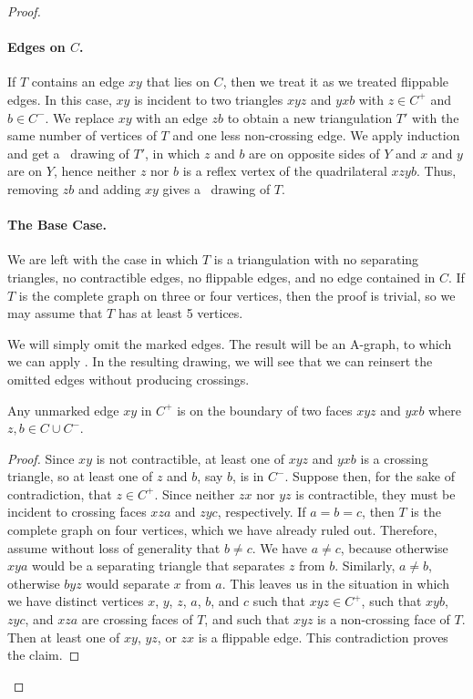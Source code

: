 \begin{proof}
	\paragraph{Edges on $C$.}
	
	If $T$ contains an edge $xy$ that lies on $C$, then we treat it as we treated flippable edges. In this case, $xy$ is incident to two triangles $xyz$ and $yxb$ with $z\in C^+$ and $b\in C^-$. We replace $xy$ with an edge $zb$ to obtain a new triangulation $T'$ with the same number of vertices of $T$ and one less non-crossing edge. We apply induction and get a \Fary\ drawing of $T'$, in which $z$ and $b$ are
	on opposite sides of $Y$ and $x$ and $y$ are on $Y$, hence 	neither $z$ nor $b$ is a reflex vertex of the quadrilateral $xzyb$.
	Thus, removing $zb$ and adding $xy$ gives a \Fary\ drawing of $T$.
	
	\paragraph{The Base Case.}
	
	We are left with the case in which $T$ is a triangulation
	with no separating triangles, no contractible edges, no flippable
	edges, and no edge contained in $C$.  If $T$ is the complete graph
	on three or four vertices, then the proof is trivial,
	so we may assume that $T$ has at least 5 vertices.

        We will simply omit the marked edges. The result will be an
        A-graph, to which we can apply . In the
        resulting drawing, we will see that we can reinsert the
        omitted edges without producing crossings.

        
	\begin{claimx} 
	Any unmarked edge $xy$ in $C^+$ is on the boundary of two
        faces $xyz$ and $yxb$ where $z,b\in C \cup C^-$.
	\end{claimx}
		
	\begin{proof}
	Since $xy$ is not contractible, at least one of $xyz$ and $yxb$ is a
	crossing triangle, so at least one of $z$ and $b$, say $b$, is in $C^-$.
	Suppose then, for the sake of contradiction, that $z\in C^+$. Since neither $zx$ nor $yz$ is contractible,
	they must be incident to crossing faces $xza$ and $zyc$, respectively.
	If $a=b=c$, then $T$ is the complete graph on four vertices,
	which we have already ruled out.  Therefore, assume without loss of
	generality that $b\neq c$.  %
	We have $a\neq c$, because otherwise $xya$ would
be a separating triangle that
        separates $z$ from $b$. Similarly, $a\neq b$, otherwise $byz$ would separate $x$ from $a$.	
	This leaves us in the situation in which we have distinct vertices $x$,
	$y$, $z$, $a$, $b$, and $c$ such that $xyz\in C^+$, such that $xyb$, $zyc$, and $xza$
	are crossing faces of $T$, and such that $xyz$ is a non-crossing face of $T$.
	Then at least one of $xy$, $yz$, or $zx$ is a flippable edge. This contradiction proves the claim.
\end{proof}	


\end{proof}
